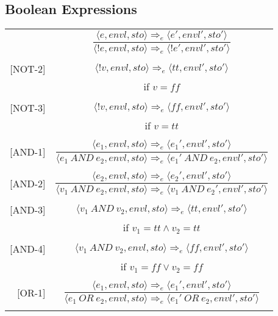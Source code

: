 \subsection{Boolean Expressions}
\begin{longtable}[c] { r c }
  \centering
  [NOT-1] & \( 
    \dfrac { \langle e, envl, sto \rangle \Rightarrow_e \langle e', envl', sto' \rangle }
      { \langle !e, envl, sto \rangle \Rightarrow_e \langle !e', envl', sto' \rangle } \)
  \\
  & \\

  [NOT-2] & \( 
    \langle !v, envl, sto \rangle \Rightarrow_e \langle tt, envl', sto' \rangle \)
  \\
  & if \( v = ff\) \\
  & \\

  [NOT-3] & \( 
    \langle !v, envl, sto \rangle \Rightarrow_e \langle ff, envl', sto' \rangle \)
  \\
  & if \( v = tt \) \\
  & \\

  [AND-1] & \( 
    \dfrac { \langle e_1, envl, sto \rangle \Rightarrow_e \langle e_1', envl', sto' \rangle }
      { \langle e_1 \ AND \ e_2, envl, sto \rangle \Rightarrow_e \langle e_1' \ AND \ e_2, envl', sto' \rangle } \)
  \\
  & \\

  [AND-2] & \( 
    \dfrac { \langle e_2, envl, sto \rangle \Rightarrow_e \langle e_2', envl', sto' \rangle }
      { \langle v_1 \ AND \ e_2, envl, sto \rangle \Rightarrow_e \langle v_1 \ AND \ e_2', envl', sto' \rangle } \)
  \\
  & \\

  [AND-3] & \( 
    \langle v_1 \ AND \ v_2, envl, sto \rangle \Rightarrow_e \langle tt, envl', sto' \rangle \)
  \\
  & if \( v_1 = tt \land v_2 = tt\) \\
  & \\

  [AND-4] & \( 
    \langle v_1 \ AND \ v_2, envl, sto \rangle \Rightarrow_e \langle ff, envl', sto' \rangle \)
  \\
  & if \( v_1 = ff \lor  v_2 = ff \) \\
  & \\

  [OR-1] & \( 
    \dfrac { \langle e_1, envl, sto \rangle \Rightarrow_e \langle e_1', envl', sto' \rangle }
      { \langle e_1 \ OR \ e_2, envl, sto \rangle \Rightarrow_e \langle e_1' \ OR \ e_2, envl', sto' \rangle } \)
  \\
  & \\


\end{longtable}
